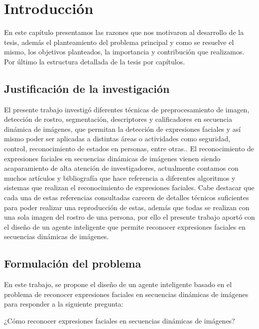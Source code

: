 \chapter{Introducción}
\setcounter{page}{1}

En este capítulo presentamos las razones que nos motivaron al desarrollo de la tesis, además el planteamiento del problema principal y como se resuelve el mismo, los objetivos planteados, la importancia y contribución que realizamos. Por último la estructura detallada de la tesis por capítulos.   

\section{Justificación de la investigación}
El presente trabajo investigó diferentes técnicas de preprocesamiento de imagen, detección de rostro, segmentación, descriptores y calificadores en secuencia dinámica de imágenes, que permitan la detección de expresiones faciales y así mismo poder ser aplicadas a distintas áreas o actividades como seguridad, control, reconocimiento de estados en personas, entre otras..
\vskip 0.3cm
El reconocimiento de expresiones faciales en secuencias dinámicas de imágenes vienen siendo acaparamiento de alta atención de investigadores, actualmente contamos con muchos artículos y bibliografía que hace referencia a diferentes algoritmos y sistemas que realizan el reconocimiento de expresiones faciales. Cabe destacar que cada una de estas referencias consultadas carecen de detalles técnicos suficientes para poder realizar una reproducción de estas, además que todas se realizan con una sola imagen del rostro de una persona, por ello el presente trabajo aportó con el diseño de un agente inteligente que permite reconocer expresiones faciales en secuencias dinámicas de imágenes.


\section{Formulación del problema}
En este trabajo, se propone el diseño de un agente inteligente basado en el problema de reconocer expresiones faciales en secuencias dinámicas de imágenes para responder a la siguiente pregunta:

 \begin{center}   
     ¿Cómo reconocer expresiones faciales en secuencias dinámicas de imágenes?
 \end{center}


